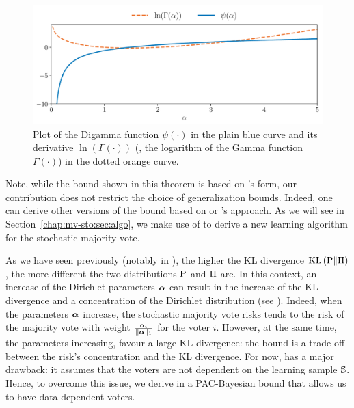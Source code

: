 \begin{figure}
    \centering
    \includegraphics[width=1.0\linewidth]{chapter_5/figures/digamma.pdf}
    \caption[Plot of the Digamma Function and its Derivative]{Plot of the Digamma function $\psi(\cdot)$ in the plain blue curve and its derivative $\ln(\Gamma(\cdot))$ (\ie, the logarithm of the Gamma function $\Gamma(\cdot)$) in the dotted orange curve.}
    \label{chap:mv-sto:fig:digamma}
\end{figure}

Note, while the bound shown in this theorem is based on \citeauthor{Seeger2002}’s form, our contribution does not restrict the choice of generalization bounds.
Indeed, one can derive other versions of the bound based on \citeauthor{McAllester1998} or \citeauthor{Catoni2007}'s approach. 
As we will see in Section~\ref{chap:mv-sto:sec:algo}, 
we make use of  to derive a new learning algorithm for the stochastic majority vote. 

As we have seen previously (notably in ), the higher the KL divergence $\KL\LP\hyperQ\|\hyperP\RP$, the more different the two distributions $\hyperQ$ and $\hyperP$ are.
In this context, an increase of the Dirichlet parameters $\paramDir$ can result in the increase of the KL divergence and a concentration of the Dirichlet distribution (see ).
Indeed, when the parameters $\paramDir$ increase, the stochastic majority vote risks tends to the risk of the majority vote with weight $\frac{\sparamDir_i}{\|\paramDir\|_{1}}$ for the voter $i$.
However, at the same time, the parameters increasing, favour a large KL divergence: the bound is a trade-off between the risk's concentration and the KL divergence.
For now,  has a major drawback: it assumes that the voters are not dependent on the learning sample $\S$.
Hence, to overcome this issue, we derive in  a PAC-Bayesian bound that allows us to have data-dependent voters.

